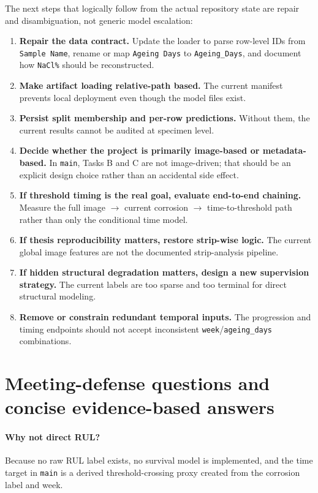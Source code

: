 \documentclass[11pt]{article}
\begin{document}
The next steps that logically follow from the actual repository state are repair and disambiguation, not generic model escalation:
\begin{enumerate}
  \item \textbf{Repair the data contract.} Update the loader to parse row-level IDs from \texttt{Sample Name}, rename or map \texttt{Ageing Days} to \texttt{Ageing\_Days}, and document how \texttt{NaCl\%} should be reconstructed.
  \item \textbf{Make artifact loading relative-path based.} The current manifest prevents local deployment even though the model files exist.
  \item \textbf{Persist split membership and per-row predictions.} Without them, the current results cannot be audited at specimen level.
  \item \textbf{Decide whether the project is primarily image-based or metadata-based.} In \texttt{main}, Tasks B and C are not image-driven; that should be an explicit design choice rather than an accidental side effect.
  \item \textbf{If threshold timing is the real goal, evaluate end-to-end chaining.} Measure the full image \(\rightarrow\) current corrosion \(\rightarrow\) time-to-threshold path rather than only the conditional time model.
  \item \textbf{If thesis reproducibility matters, restore strip-wise logic.} The current global image features are not the documented strip-analysis pipeline.
  \item \textbf{If hidden structural degradation matters, design a new supervision strategy.} The current labels are too sparse and too terminal for direct structural modeling.
  \item \textbf{Remove or constrain redundant temporal inputs.} The progression and timing endpoints should not accept inconsistent \texttt{week}/\texttt{ageing\_days} combinations.
\end{enumerate}

\appendix

\section{Meeting-defense questions and concise evidence-based answers}

\paragraph{Why not direct RUL?}
Because no raw RUL label exists, no survival model is implemented, and the time target in \texttt{main} is a derived threshold-crossing proxy created from the corrosion label and week.
\end{document}
